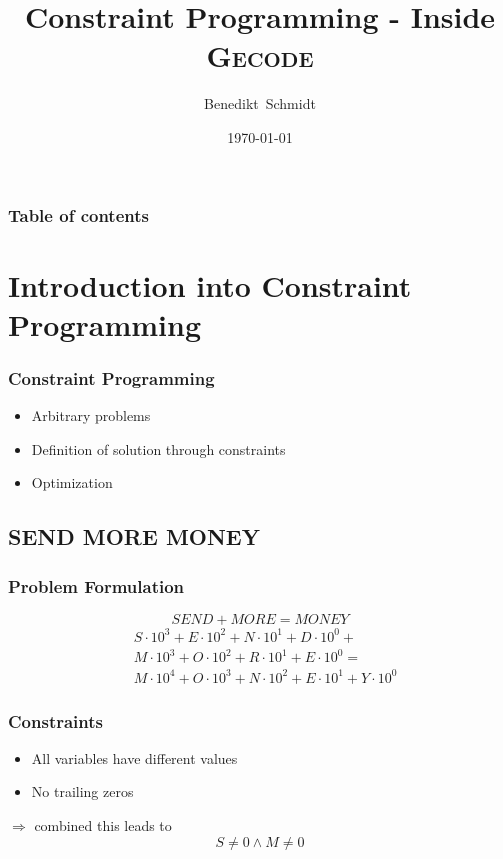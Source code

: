 \documentclass[hyperref={pdfpagelabels=false}]{beamer}
\title{Constraint Programming - Inside \textsc{Gecode}}
\author[Schmidt]{Benedikt~Schmidt}
\institute{Technische~Universit\"at~M\"unchen,~Germany}
\date{\today}
\begin{document}
\begin{frame}
\titlepage
\end{frame} 

\begin{frame}
\frametitle{Table of contents}
\tableofcontents
\end{frame} 

\section{Introduction into Constraint Programming}
\begin{frame}
	\frametitle{Constraint Programming}
	
	\begin{itemize}
		\item Arbitrary problems
		\item Definition of solution through constraints
		\item Optimization
	\end{itemize}
\end{frame}

\subsection{SEND MORE MONEY}
\begin{frame}
	\frametitle{Problem Formulation}
	
	\[SEND + MORE = MONEY\]
	\begin{equation}
	\begin{split}
		& S \cdot 10^3 + E \cdot 10^2 + N \cdot 10^1 + D \cdot 10^0 + \\ 
		& M \cdot 10^3 + O \cdot 10^2 + R \cdot 10^1 + E \cdot 10^0 = \\ 
		& M \cdot 10^4 + O \cdot 10^3 + N \cdot 10^2 + E \cdot 10^1 + Y \cdot 10^0
	\end{split}
	\end{equation}	
\end{frame}

\begin{frame}
	\frametitle{Constraints}
	
	\begin{itemize}
		\item All variables have different values
		\item No trailing zeros
	\end{itemize}
	
	$\Rightarrow$ combined this leads to
	\begin{equation}
		S \ne 0 \land M \ne 0
	\end{equation}
\end{frame}
\end{document}
